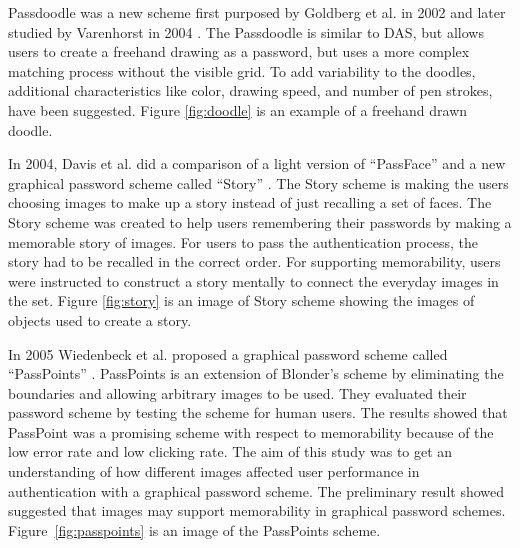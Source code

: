   Passdoodle was a new scheme first purposed by Goldberg et al. in 2002 and later studied by Varenhorst in 2004 \cite{PassDoodle,Varenhorst}. The Passdoodle is similar to DAS, but allows users to create a freehand drawing as a password, but uses a more complex matching process without the visible grid. To add variability to the doodles, additional characteristics like color, drawing speed, and number of pen strokes, have been suggested. Figure \ref{fig:doodle} is an example of a freehand drawn doodle.

  In 2004, Davis et al. did a comparison of a light version of ``PassFace'' and a new graphical password scheme called ``Story'' \cite{Davis}. The Story scheme is making the users choosing images to make up a story instead of just recalling a set of faces. The Story scheme was created to help users remembering their passwords by making a memorable story of images. For users to pass the authentication process, the story had to be recalled in the correct order. For supporting memorability, users were instructed to construct a story mentally to connect the everyday images in the set. Figure \ref{fig:story} is an image of Story scheme showing the images of objects used to create a story.

  In 2005 Wiedenbeck et al. proposed a graphical password scheme called ``PassPoints'' \cite{Wiedenbeck2}. PassPoints is an extension of Blonder's \cite{Blonder} scheme by eliminating the boundaries and allowing arbitrary images to be used. They evaluated their password scheme by testing the scheme for human users. The results showed that PassPoint was a promising scheme with respect to memorability because of the low error rate and low clicking rate. The aim of this study was to get an understanding of how different images affected user performance in authentication with a graphical password scheme. The preliminary result showed suggested that images may support memorability in graphical password schemes. Figure~\ref{fig:passpoints} is an image of the PassPoints scheme.

